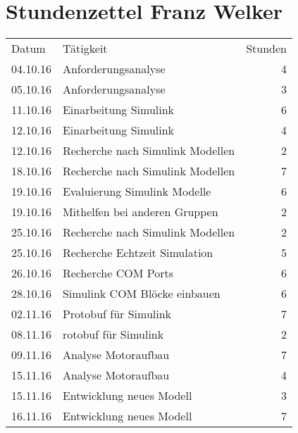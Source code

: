 \chapter{Stundenzettel Franz Welker}
\begin{minipage}{0.5\textwidth}
    \begin{tabular}{llr}
       Datum& Tätigkeit&Stunden\\
       
       04.10.16&Anforderungsanalyse&4 \\
       05.10.16&Anforderungsanalyse&3 \\
       
       11.10.16&Einarbeitung Simulink&6 \\
       12.10.16&Einarbeitung Simulink&4 \\
       12.10.16&Recherche nach Simulink Modellen&2 \\
       
       
       18.10.16&Recherche nach Simulink Modellen&7 \\
       19.10.16&Evaluierung Simulink Modelle&6 \\
       19.10.16&Mithelfen bei anderen Gruppen&2 \\
       
       
       25.10.16&Recherche nach Simulink Modellen&2 \\
       25.10.16&Recherche Echtzeit Simulation&5 \\
       26.10.16&Recherche COM Ports&6 \\
       
       28.10.16&Simulink COM Blöcke einbauen&6\\
       02.11.16&Protobuf für Simulink&7 \\
       
       08.11.16&rotobuf für Simulink&2 \\
       09.11.16&Analyse Motoraufbau&7 \\
       
       15.11.16&Analyse Motoraufbau&4 \\
       15.11.16&Entwicklung neues Modell&3 \\
       16.11.16&Entwicklung neues Modell&7 \\


%
       

\end{tabular}
\end{minipage}
